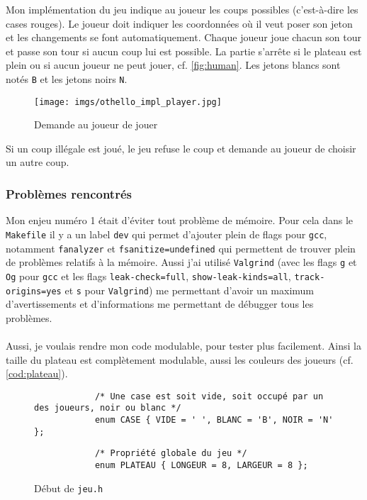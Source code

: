 \documentclass{article}
\begin{document}
Mon implémentation du jeu indique au joueur les coups possibles (c'est-à-dire les
cases rouges). Le joueur doit indiquer les coordonnées où il veut poser son jeton
et les changements se font automatiquement. Chaque joueur joue chacun son tour et
passe son tour si aucun coup lui est possible. La partie s'arrête si le plateau
est plein ou si aucun joueur ne peut jouer, cf. \autoref{fig:human}. Les jetons
blancs sont notés \texttt{B} et les jetons noirs \texttt{N}.

\begin{figure}[h]
    \centering
    \texttt{[image: imgs/othello\_impl\_player.jpg]}
    \caption{Demande au joueur de jouer}
    \label{fig:human}
\end{figure}

Si un coup illégale est joué, le jeu refuse le coup et demande au joueur de
choisir un autre coup.

\subsubsection{Problèmes rencontrés}
Mon enjeu numéro 1 était d'éviter tout problème de mémoire. Pour cela dans le
\texttt{Makefile} il y a un label \texttt{dev} qui permet d'ajouter plein de flags
pour \texttt{gcc}, notamment \texttt{fanalyzer} et \texttt{fsanitize=undefined} qui
permettent de trouver plein de problèmes relatifs à la mémoire. Aussi j'ai utilisé
\texttt{Valgrind} (avec les flags \texttt{g} et \texttt{Og} pour \texttt{gcc} et
les flags \texttt{leak-check=full}, \texttt{show-leak-kinds=all},
\texttt{track-origins=yes} et \texttt{s} pour \texttt{Valgrind}) me permettant
d'avoir un maximum d'avertissements et d'informations me permettant de débugger
tous les problèmes.
\\\\
Aussi, je voulais rendre mon code modulable, pour tester plus facilement. Ainsi
la taille du plateau est complètement modulable, aussi les couleurs des joueurs
(cf. \autoref{cod:plateau}).

\begin{figure}[h]
    \centering
    \begin{minipage}{0.8\textwidth}
        \begin{verbatim}
            /* Une case est soit vide, soit occupé par un des joueurs, noir ou blanc */
            enum CASE { VIDE = ' ', BLANC = 'B', NOIR = 'N' };
        \end{verbatim}

        \begin{verbatim}
            /* Propriété globale du jeu */
            enum PLATEAU { LONGEUR = 8, LARGEUR = 8 };
        \end{verbatim}
    \end{minipage}
    \caption{Début de \texttt{jeu.h}}
    \label{cod:plateau}
\end{figure}
\end{document}
